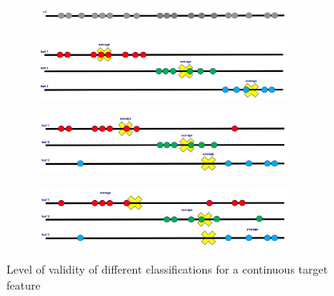 \begin{figure}[h]
  \centering
  
  \begin{subfigure}{0.6\textwidth}
    \centering
    \includegraphics[width=0.9\textwidth]{assets/trees/cont/target_ori_set.png}
  \end{subfigure}

  \vspace*{0.5cm}
  \begin{subfigure}{0.6\textwidth}
    \centering
    \includegraphics[width=0.9\textwidth]{assets/trees/cont/target_good.png}
  \end{subfigure}

  \vspace*{0.5cm}
  \begin{subfigure}{0.6\textwidth}
    \centering
    \includegraphics[width=0.9\textwidth]{assets/trees/cont/target_ok.png}
  \end{subfigure}

  \vspace*{0.5cm}
  \begin{subfigure}{0.6\textwidth}
    \centering
    \includegraphics[width=0.9\textwidth]{assets/trees/cont/target_bad.png}
  \end{subfigure}
  \caption{Level of validity of different classifications for a continuous target feature}
  \label{fig:3_classifications_target}
\end{figure}

